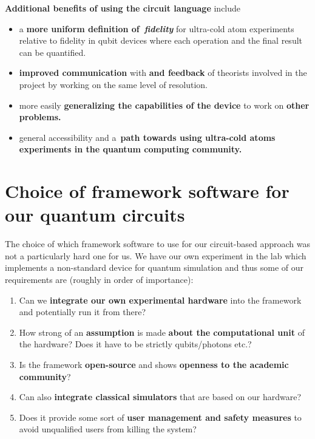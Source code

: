 \documentclass[%
 reprint,
 amsmath,amssymb,
 aps,
]{revtex4-1}
\providecommand{\tightlist}{\setlength{\itemsep}{0pt}\setlength{\parskip}{0pt}}%
\begin{document}
\par\null

\textbf{Additional benefits of using the circuit language} include

\begin{itemize}
\tightlist
\item
  a \textbf{more uniform definition of~}\emph{\textbf{fidelity}} for
  ultra-cold atom experiments relative to fidelity in qubit devices
  where each operation and the final result can be quantified.
\item
  \textbf{improved communication} with \textbf{and feedback} of
  theorists involved in the project by working on the same level of
  resolution.
\item
  more easily \textbf{generalizing the capabilities of the device} to
  work on \textbf{other problems.}
\item
  general accessibility and a~\textbf{path towards using ultra-cold
  atoms experiments in the quantum computing community.}
\end{itemize}

\section*{}\label{section}

\section*{Choice of framework software for our quantum
circuits}\label{choice-of-framework-software-for-our-quantum-circuits}

The choice of which framework software to use for our circuit-based
approach was not a particularly hard one for us. We have our own
experiment in the lab which implements a non-standard device for quantum
simulation and thus some of our requirements are (roughly in order of
importance):

\begin{enumerate}
\tightlist
\item
  Can we \textbf{integrate our own experimental hardware} into the
  framework and potentially run it from there?
\item
  How strong of an \textbf{assumption} is made \textbf{about the
  computational unit} of the hardware? Does it have to be strictly
  qubits/photons etc.?
\item
  Is the framework \textbf{open-source} and shows \textbf{openness to
  the academic community}?
\item
  Can also \textbf{integrate classical simulators} that are based on our
  hardware?
\item
  Does it provide some sort of \textbf{user management and safety
  measures} to avoid unqualified users from killing the system?
\end{enumerate}
\end{document}
